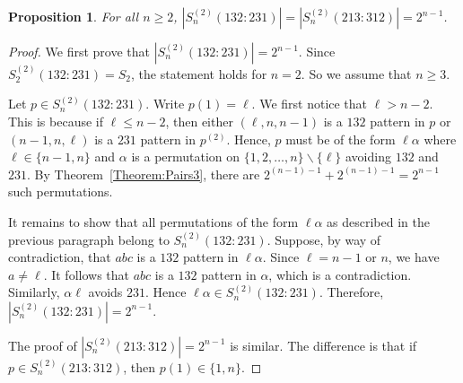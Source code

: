\documentclass[10pt,a4paper]{amsart}
\newtheorem{proposition}[theorem]{Proposition}
\numberwithin{equation}{section}
\begin{document}
\begin{proposition}
For all $n\geq2$, $|S_n^{(2)}(132:231)|=|S_n^{(2)}(213:312)|=2^{n-1}$.
\end{proposition}
\begin{proof}
We first prove that $|S_n^{(2)}(132:231)|=2^{n-1}$. Since $S_2^{(2)}(132:231)=S_2$, the statement holds for $n=2$. So we assume that $n\geq3$.

    Let $p\in S_n^{(2)}(132:231)$. Write $p(1)=\ell$. We first notice that $\ell>n-2$. This is because if $\ell\leq n-2$, then either $(\ell,n,n-1)$ is a $132$ pattern in $p$ or $(n-1,n,\ell)$ is a $231$ pattern in $p^{(2)}$. Hence, $p$ must be of the form $\ell\alpha$ where $\ell\in\{n-1,n\}$ and $\alpha$ is a permutation on $\{1,2,\ldots,n\}\backslash\{\ell\}$ avoiding $132$ and $231$. By Theorem~\ref{Theorem:Pairs3}, there are $2^{(n-1)-1}+2^{(n-1)-1}=2^{n-1}$ such permutations.

    It remains to show that all permutations of the form $\ell\alpha$ as described in the previous paragraph belong to $S_n^{(2)}(132:231)$. 
Suppose, by way of contradiction, that $abc$ is a $132$ pattern in $\ell\alpha$. Since $\ell=n-1$ or $n$, we have $a\neq \ell$. It follows that $abc$ is a $132$ pattern in $\alpha$, which is a contradiction. Similarly, $\alpha\ell$ avoids $231$. Hence $\ell\alpha\in S_n^{(2)}(132:231)$. Therefore, $|S_n^{(2)}(132:231)|=2^{n-1}$.

    The proof of $|S_n^{(2)}(213:312)|=2^{n-1}$ is similar. The difference is that if $p\in S_n^{(2)}(213:312)$, then $p(1)\in\{1,n\}$.
\end{proof}
\end{document}
